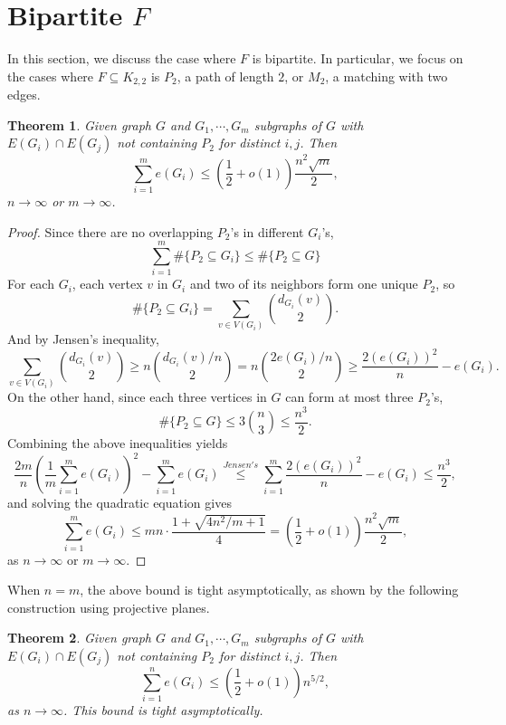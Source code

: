 \documentclass[12pt]{report}
\newtheorem{theorem}{Theorem}[chapter]
\begin{document}
\section{Bipartite $F$}

In this section, we discuss the case where $F$ is bipartite. In particular, we focus on the cases
where $F \subseteq K_{2, 2}$ is $P_2$, a path of length $2$, or $M_2$, a matching with two edges.

\begin{theorem}
  Given graph $G$ and $G_1, \cdots, G_m$ subgraphs of $G$ with $E(G_i) \cap E(G_j)$ not containing
  $P_2$ for distinct $i, j$. Then
  \[
    \sum_{i = 1}^m e(G_i) \leq \left(\frac{1}{2} + o(1)\right)\frac{n^{2}\sqrt{m}}{2},
  \]
  $n \to \infty$ or $m \to \infty$.
\end{theorem}

\begin{proof}
  Since there are no overlapping $P_2$'s in different $G_i$'s, 
  \[
    \sum_{i = 1}^m \#\{P_2 \subseteq G_i\} \leq \#\{P_2 \subseteq G\}
  \]
  For each $G_i$, each vertex $v$ in $G_i$ and two of its neighbors form one unique $P_2$, so
  \[
    \#\{P_2 \subseteq G_i\} = \sum_{v \in V(G_i)} \binom{d_{G_i}(v)}{2}.
  \]
  And by Jensen's inequality,
  \[
    \sum_{v \in V(G_i)} \binom{d_{G_i}(v)}{2} \geq n\binom{d_{G_i}(v)/n}{2} = n\binom{2e(G_i)/n}{2} \geq \frac{2(e(G_i))^2}{n} - e(G_i).
  \]
  On the other hand, since each three vertices in $G$ can form at most three $P_2$'s, 
  \[
    \#\{P_2 \subseteq G\} \leq 3\binom{n}{3} \leq \frac{n^3}{2}.
  \]
  Combining the above inequalities yields
  \[
    \frac{2m}{n}\left(\frac{1}{m}\sum_{i = 1}^m e(G_i)\right)^2 - \sum_{i = 1}^m e(G_i) \overset{Jensen's}{\leq} \sum_{i = 1}^m \frac{2(e(G_i))^2}{n} - e(G_i) \leq \frac{n^3}{2},
  \]
  and solving the quadratic equation gives
  \[
    \sum_{i = 1}^m e(G_i) \leq mn \cdot \frac{1 + \sqrt{4n^2/m + 1}}{4} =  \left(\frac{1}{2} + o(1)\right)\frac{n^{2}\sqrt{m}}{2},
  \]
  as $n \to \infty$ or $m \to \infty$.
\end{proof}

When $n = m$, the above bound is tight asymptotically, as shown by the following construction using projective
planes.

\begin{theorem}
  Given graph $G$ and $G_1, \cdots, G_m$ subgraphs of $G$ with $E(G_i) \cap E(G_j)$ not containing
  $P_2$ for distinct $i, j$. Then
  \[
    \sum_{i = 1}^n e(G_i) \leq \left(\frac{1}{2} + o(1)\right)n^{5/2},
  \]
  as $n \to \infty$. This bound is tight asymptotically.
\end{theorem}
\end{document}
